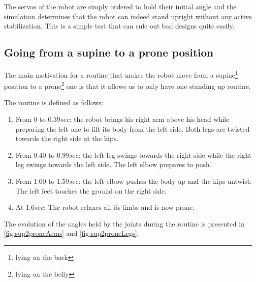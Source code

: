 The servos of the robot are simply ordered to hold their initial angle and the simulation determines that the robot can indeed stand upright without any active stabilization. This is a simple test that can rule out bad designs quite easily.

\subsection{Going from a supine to a prone position}
The main motivation for a routine that makes the robot move from a supine\footnote{lying on the back}  position to a prone\footnote{lying on the belly} one is that it allows us to only have one standing up routine. 

The routine is defined as follows:\begin{enumerate}
\item From $0$ to $0.39sec$: the robot brings his right arm above his head while preparing the left one to lift its body from the left side. Both legs are twisted towards the right side at the hips.

\item From $0.40$ to $0.99sec$: the left leg swings towards the right side while the right leg swings towards the left side. The left elbow prepares to push.

\item From $1.00$ to $1.59sec$: the left elbow pushes the body up and the hips untwist. The left feet touches the ground on the right side.

\item At $1.6sec$: The robot relaxes all its limbs and is now prone.
\end{enumerate}

The evolution of the angles held by the joints during the routine is presented in \cref{fig:sup2proneArms} and \cref{fig:sup2proneLegs}. 


